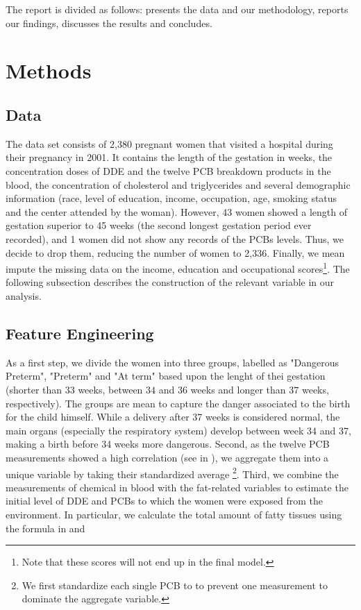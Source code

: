 \documentclass[10pt]{jmlr}%
\begin{document}
The report is divided as follows:  presents the data and our methodology,   reports our findings,  discusses the results and concludes.


\section{Methods}
\label{sec:method}

\subsection{Data}
\label{sec:data}
The data set consists of 2,380 pregnant women that visited a hospital during their pregnancy in 2001. It contains the length of the gestation in weeks, the concentration doses of DDE and the twelve PCB breakdown products in the blood, the concentration of cholesterol and triglycerides and several demographic information (race, level of education, income, occupation, age, smoking status and the center attended by the woman). However, 43 women showed a length of gestation superior to 45 weeks (the second longest gestation period ever recorded), and 1 women did not show any records of the PCBs levels. Thus, we decide to drop them, reducing the number of women to 2,336. Finally, we mean impute the missing data on the income, education and occupational scores\footnote{Note that these scores will not end up in the final model.}. The following subsection describes the construction of the relevant variable in our analysis.

\subsection{Feature Engineering}
\label{sec:feature}
As a first step, we divide the women into three groups, labelled as "Dangerous Preterm", "Preterm" and "At term" based upon the lenght of thei gestation (shorter than $33$ weeks, between $34$ and $36$ weeks and longer than $37$ weeks, respectively). The groups are mean to capture the danger associated to the birth for the child himself. While a delivery after 37 weeks is considered normal, the main organs (especially the respiratory system) develop between week 34 and 37, making a birth before 34 weeks more dangerous. Second, as the twelve PCB measurements showed a high correlation (see  in ), we aggregate them into a unique variable by taking their standardized average \footnote{We first standardize each single PCB to to prevent one measurement to dominate the aggregate variable.}. Third, we combine the measurements of chemical in blood with the fat-related variables to estimate the initial level of DDE and PCBs to which the women were exposed from the environment. In particular, we calculate the total amount of fatty tissues using the formula in \cite{Phillips1989} and \cite{Bernert2007}
\end{document}

